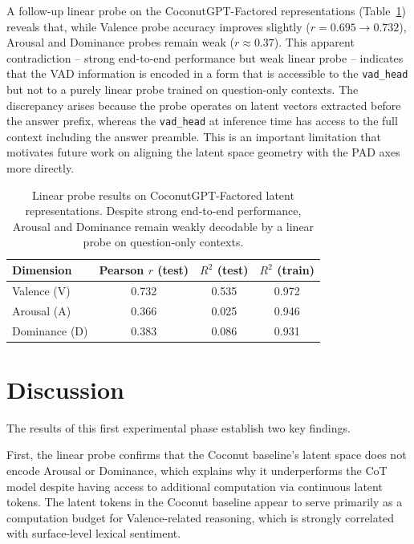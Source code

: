 \documentclass[12pt,twoside]{report}
\begin{document}
A follow-up linear probe on the CoconutGPT-Factored representations (Table~\ref{tab:probe_factored}) reveals that, while Valence probe accuracy improves slightly ($r = 0.695 \to 0.732$), Arousal and Dominance probes remain weak ($r \approx 0.37$).
This apparent contradiction -- strong end-to-end performance but weak linear probe -- indicates that the VAD information is encoded in a form that is accessible to the \texttt{vad\_head} but not to a purely linear probe trained on question-only contexts.
The discrepancy arises because the probe operates on latent vectors extracted before the answer prefix, whereas the \texttt{vad\_head} at inference time has access to the full context including the answer preamble.
This is an important limitation that motivates future work on aligning the latent space geometry with the PAD axes more directly.

\begin{table}[H]
\centering
\begin{tabular}{lccc}
\toprule
\textbf{Dimension} & \textbf{Pearson $r$ (test)} & \textbf{$R^2$ (test)} & \textbf{$R^2$ (train)} \\
\midrule
Valence (V)   & 0.732 & 0.535 & 0.972 \\
Arousal (A)   & 0.366 & 0.025 & 0.946 \\
Dominance (D) & 0.383 & 0.086 & 0.931 \\
\bottomrule
\end{tabular}
\caption{Linear probe results on CoconutGPT-Factored latent representations. Despite strong end-to-end performance, Arousal and Dominance remain weakly decodable by a linear probe on question-only contexts.}
\label{tab:probe_factored}
\end{table}

\section{Discussion}

The results of this first experimental phase establish two key findings.

First, the linear probe confirms that the Coconut baseline's latent space does not encode Arousal or Dominance, which explains why it underperforms the CoT model despite having access to additional computation via continuous latent tokens.
The latent tokens in the Coconut baseline appear to serve primarily as a computation budget for Valence-related reasoning, which is strongly correlated with surface-level lexical sentiment.
\end{document}
